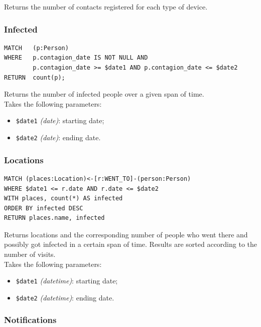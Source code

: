 \documentclass[12pt, a4paper]{article}
\begin{document}
\noindent %
Returns the number of contacts registered for each type of device.

\subsubsection{Infected}
\begin{tcolorbox}[fontupper=\scriptsize]
    \begin{verbatim}
MATCH   (p:Person)
WHERE   p.contagion_date IS NOT NULL AND
        p.contagion_date >= $date1 AND p.contagion_date <= $date2
RETURN  count(p);
    \end{verbatim}
\end{tcolorbox}

\noindent %
Returns the number of infected people over a given span of time. \\
Takes the following parameters: 
\begin{itemize}
    \item \texttt{\$date1} \emph{(date)}: starting date;
    \item \texttt{\$date2} \emph{(date)}: ending date.
\end{itemize}

\subsubsection{Locations}
\begin{tcolorbox}[fontupper=\scriptsize]
    \begin{verbatim}
MATCH (places:Location)<-[r:WENT_TO]-(person:Person)
WHERE $date1 <= r.date AND r.date <= $date2
WITH places, count(*) AS infected
ORDER BY infected DESC
RETURN places.name, infected
    \end{verbatim}
\end{tcolorbox}
\noindent %
Returns locations and the corresponding number of people who went there and possibly got infected in a certain span of time. Results are sorted according to the number of visits. \\
Takes the following parameters: 
\begin{itemize}
    \item \texttt{\$date1} \emph{(datetime)}: starting date;
    \item \texttt{\$date2} \emph{(datetime)}: ending date.
\end{itemize}

\subsubsection{Notifications}
\end{document}
